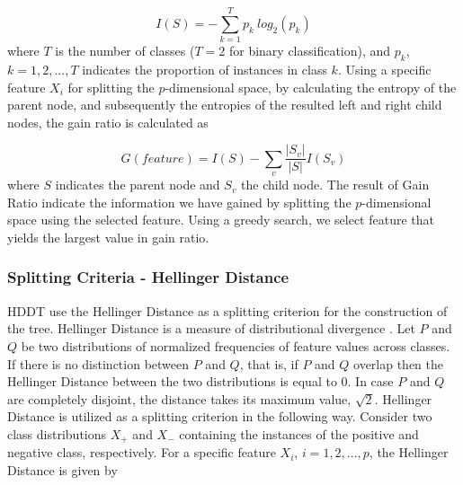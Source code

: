 \documentclass{acm_proc_article-sp}
\begin{document}
\begin{equation*}
	I(S) = -\sum_{k = 1}^{T}p_k \ log_2(p_k)
\end{equation*}
where $T$ is the number of classes ($T=2$ for binary classification), and $p_k$, $k = 1,2,...,T$ indicates the proportion of instances in class $k$. Using a specific feature $X_i$ for splitting the $p$-dimensional space, by calculating the entropy of the parent node, and subsequently the entropies of the resulted left and right child nodes, the gain ratio is calculated as 

\begin{equation*}
	G(feature) = I(S) - \sum_{v}^{}\frac{|S_v|}{|S|}I(S_v)
\end{equation*} 
where $S$ indicates the parent node and $S_v$ the child node. The result of Gain Ratio indicate the information we have gained by splitting the $p$-dimensional space using the selected feature. Using a greedy search, we select feature that yields the largest value in gain ratio.

\subsubsection{Splitting Criteria - Hellinger Distance}
HDDT use the Hellinger Distance as a splitting criterion for the construction of the tree. Hellinger Distance is a measure of distributional divergence \cite{Cieslak2008}. Let $P$ and $Q$ be two distributions of normalized frequencies of feature values across classes. If there is no distinction between $P$ and $Q$, that is, if $P$ and $Q$ overlap then the Hellinger Distance between the two distributions is equal to 0. In case $P$ and $Q$ are completely disjoint, the distance takes its  maximum value, $\sqrt{2}$. Hellinger Distance is utilized as a splitting criterion in the following way. Consider two class distributions $X_+$ and $X_-$ containing the instances of the positive and negative class, respectively. For a specific feature $X_i$, $i = 1,2,...,p$, the Hellinger Distance is given by 
\end{document}
